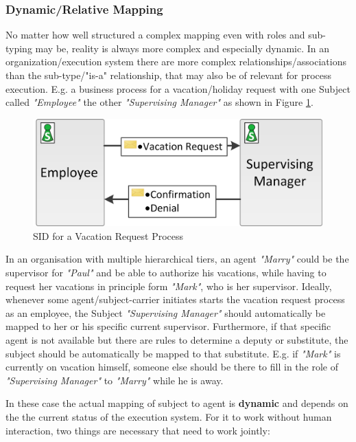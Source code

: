 \subsubsection{Dynamic/Relative Mapping}
\label{sec:dynamicMapping}

No matter how well structured a complex mapping even with roles and sub-typing may be, reality is always more complex and especially dynamic. In an organization/execution system there are more complex relationships/associations than the sub-type/"is-a" relationship, that may also be of relevant for process execution. E.g. a business process for a vacation/holiday request with one Subject called \textit{"Employee"} the other \textit{"Supervising Manager"} as shown in Figure \ref{fig:vacationRequestSID}.

\begin{figure}[htbp]
	\centering
	\includegraphics[width=0.4\linewidth]{Figures/Implementation/VacationRequestSID.png}
	\caption[SID for a Vacation Request Process]{SID for a Vacation Request Process}
	\label{fig:vacationRequestSID}
\end{figure}

 In an organisation with multiple hierarchical tiers, an agent \textit{"Marry"} could be the supervisor for \textit{"Paul"} and be able to authorize his vacations, while having to request her vacations in principle form \textit{"Mark"}, who is her supervisor. Ideally, whenever some agent/subject-carrier initiates starts the vacation request process as an employee, the Subject \textit{"Supervising Manager"} should automatically be mapped to her or his specific current supervisor. Furthermore, if that specific agent is not available but there are rules to determine a deputy or substitute, the subject should be automatically be mapped to that substitute. E.g. if \textit{"Mark"} is currently on vacation himself, someone else should be there to fill in the role of \textit{"Supervising Manager"} to \textit{"Marry"} while he is away. 

In these case the actual mapping of subject to agent is \textbf{dynamic} and depends on the the current status of the execution system. For it to work without human interaction, two things are necessary that need to work jointly:

